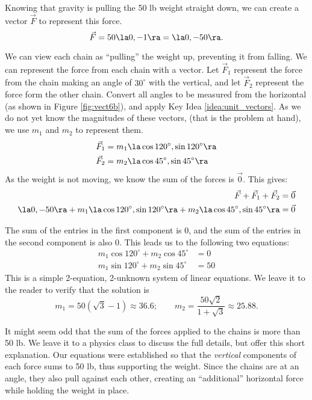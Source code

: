 {Knowing that gravity is pulling the 50 lb weight straight down, we can create a vector $\vec F$ to represent this force. 
\[
\vec F = 50\la 0,-1\ra = \la 0,-50\ra.
\]

We can view each chain as ``pulling'' the weight up, preventing it from falling. We can represent the force from each chain with a vector. Let $\vec F_1$ represent the force from the chain making an angle of $30^\circ$ with the vertical, and let $\vec F_2$ represent the force form the other chain. Convert all angles to be measured from the horizontal (as shown in Figure \ref{fig:vect6b}), and apply Key Idea \ref{idea:unit_vectors}. As we do not yet know the magnitudes of these vectors, (that is the problem at hand), we use $m_1$ and $m_2$ to represent them.
\begin{align*}
\vec F_1 &= m_1\la \cos 120^\circ,\sin120^\circ\ra\\
\vec F_2 &= m_2\la \cos 45^\circ,\sin45^\circ\ra
\end{align*}
As the weight is not moving, we know the sum of the forces is $\vec 0$. This gives:
\begin{align*}
\vec F + \vec F_1 + \vec F_2 & = \vec 0\\
\la 0,-50\ra + m_1\la \cos 120^\circ,\sin120^\circ\ra + m_2\la \cos 45^\circ,\sin45^\circ\ra &=\vec 0
\end{align*}

The sum of the entries in the first component is 0, and the sum of the entries in the second component is also 0. This leads us to the following two equations:
\begin{align*}
m_1\cos120^\circ + m_2\cos45^\circ &=0 \\
m_1\sin120^\circ + m_2\sin45^\circ &=50
\end{align*}
This is a simple 2-equation, 2-unknown system of linear equations. We leave it to the reader to verify that the solution is 
\[
m_1=50(\sqrt{3}-1) \approx 36.6;\qquad m_2=\frac{50\sqrt{2}}{1+\sqrt{3}} \approx 25.88.
\]

It might seem odd that the sum of the forces applied to the chains is more than 50 lb. We leave it to a physics class to discuss the full details, but offer this short explanation. Our equations were established so that the \textit{vertical} components of each force sums to 50 lb, thus supporting the weight. Since the chains are at an angle, they also pull against each other, creating an ``additional'' horizontal force while holding the weight in place.
}\\

